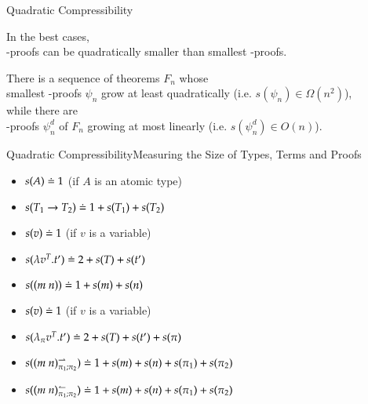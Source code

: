 \documentclass[9pt]{beamer}
\newcommand{\mypause}{\pause}
\begin{document}
\begin{frame}{Quadratic Compressibility}
\begin{center}
In the best cases,\\
\alert{{\NDd}-proofs can be quadratically smaller than smallest {\ND}-proofs.}

\medskip
\medskip

\mypause

There is a sequence of theorems $F_n$ whose \\
smallest {\ND}-proofs $\psi_n$ grow at least quadratically (i.e. $s(\psi_n) \in \Omega(n^2)$),\\ 
while there are \\ 
{\NDd}-proofs $\psi^d_n$ of $F_n$ growing at most linearly (i.e. $s(\psi^d_n) \in O(n)$).
\end{center}
\end{frame}

\begin{frame}{Quadratic Compressibility}{Measuring the Size of Types, Terms and Proofs}
\begin{definition}
\begin{itemize}
 \item $s(A) \doteq 1$ (if $A$ is an atomic type)
 \item $s(T_1 \rightarrow T_2) \doteq 1 + s(T_1) + s(T_2)$
\end{itemize}
\end{definition}

\begin{definition}
\begin{itemize}
 \item $s(v) \doteq 1$ (if $v$ is a variable)
 \item $s(\lambda v^T. t') \doteq 2 + s(T) + s(t')$
 \item $s((m \ n)) \doteq 1 + s(m) + s(n)$ 
\end{itemize}
\end{definition}

\begin{definition}
\begin{itemize}
 \item $s(v) \doteq 1$ (if $v$ is a variable)
 \item $s(\lambda_{\pi} v^T. t') \doteq 2 + s(T) + s(t') + s(\pi)$
 \item $s((m \ n)^{\rightharpoonup}_{{\pi_1;\pi_2}}) \defEq 1 + s(m) + s(n) + s(\pi_1) + s(\pi_2)$
  \item $s((m \ n)^{\leftharpoonup}_{{\pi_1;\pi_2}}) \defEq 1 + s(m) + s(n) + s(\pi_1) + s(\pi_2)$
\end{itemize}
\end{definition}

\end{frame}
\end{document}
